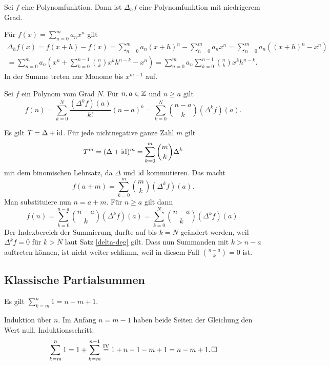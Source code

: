 \begin{Satz}\label{delta-deg}
Sei $f$ eine Polynomfunktion. Dann ist $\Delta_h f$ eine
Polynomfunktion mit niedrigerem Grad.
\end{Satz}
\begin{Beweis} Für $f(x)=\sum_{n=0}^m a_n x^n$ gilt
\begin{gather*}
\Delta_h f(x) = f(x+h) - f(x) = \sum_{n=0}^m a_n (x+h)^n - \sum_{n=0}^m a_n x^n
= \sum_{n=0}^m a_n ((x+h)^n - x^n)\\
= \sum_{n=0}^m a_n (x^n + \sum_{k=0}^{n-1}\binom{n}{k}x^k h^{n-k} - x^n)
= \sum_{n=0}^m a_n \sum_{k=0}^{n-1}\binom{n}{k}x^k h^{n-k}.
\end{gather*}
In der Summe treten nur Monome bis $x^{m-1}$ auf.\,\qedsymbol
\end{Beweis}

\begin{Satz} Sei $f$ ein Polynom vom Grad $N$. Für $n,a\in\mathbb Z$ und $n\ge a$ gilt
\[f(n) = \sum_{k=0}^N \frac{(\Delta^k f)(a)}{k!}(n-a)^{\underline k}
= \sum_{k=0}^N \binom{n-a}{k}(\Delta^k f)(a).\]
\end{Satz}
\begin{Beweis}
Es gilt $T=\Delta+\operatorname{id}$. Für jede nichtnegative ganze Zahl $m$ gilt
\[T^m = (\Delta+\operatorname{id})^m = \sum_{k=0}^m\binom{m}{k}\Delta^k\]
mit dem binomischen Lehrsatz, da $\Delta$ und $\operatorname{id}$ kommutieren. Das macht
\[f(a + m) = \sum_{k=0}^m\binom{m}{k}(\Delta^k f)(a).\]
Man substituiere nun $n = a+m$. Für $n\ge a$ gilt dann
\[f(n) = \sum_{k=0}^{n-a}\binom{n-a}{k}(\Delta^k f)(a)
= \sum_{k=0}^N\binom{n-a}{k}(\Delta^k f)(a).\]
Der Indexbereich der Summierung durfte auf bis $k=N$ geändert werden, weil
$\Delta^k f = 0$ für $k>N$ laut Satz \ref{delta-deg} gilt. Dass nun
Summanden mit $k>n-a$ auftreten können, ist nicht weiter schlimm, weil
in diesem Fall $\binom{n-a}{k}=0$ ist.\,\qedsymbol
\end{Beweis}

\newpage
\subsection{Klassische Partialsummen}

\begin{Satz}%
\label{sum-const}\newlinefirst
Es gilt $\displaystyle\sum_{k=m}^n 1 = n-m+1$.
\end{Satz}
\begin{Beweis}
Induktion über $n$. Im Anfang $n=m-1$ haben beide Seiten
der Gleichung den Wert null. Induktionsschritt:
\[\sum_{k=m}^n 1 = 1 + \sum_{k=m}^{n-1}
\stackrel{\mathrm{IV}}= 1 + n-1-m+1 = n-m+1.\,\square\]
\end{Beweis}

